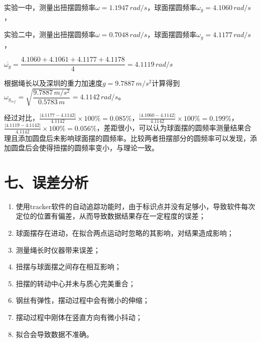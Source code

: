 \documentclass[11pt]{article}
\begin{document}
\begin{enumerate}
    实验一中，测量出扭摆圆频率$\omega = 1.1947\,rad/s$，球面摆圆频率$\omega_g = 4.1060\,rad/s$，
    
    实验二中，测量出扭摆圆频率$\omega = 0.7048\,rad/s$，球面摆圆频率$\omega_g = 4.1177\,rad/s$，
    
    $\overline{\omega_g}=\dfrac{4.1060+4.1061+4.1177+4.1178}{4}=4.1119\,rad/s$
    
    根据绳长以及深圳的重力加速度$g=9.7887\,m/s^2$计算得到$\omega_{g_{ref}}=\sqrt{\dfrac{9.7887\,m/s^2}{0.5783\,m}}=4.1142\,rad/s$。
    
    经过对比，$\frac{|4.1177-4.1142|}{4.1142}\times100\%=0.085\%$，$\frac{|4.1060-4.1142|}{4.1142}\times100\%=0.199\%$，$\frac{|4.1119-4.1142|}{4.1142}\times100\%=0.056\%$，差距很小，可以认为球面摆的圆频率测量结果合理且添加圆盘后未影响球面摆的圆频率。比较两者扭摆部分的圆频率可以发现，添加圆盘后会使得扭摆的圆频率变小，与理论一致。
\end{enumerate}

\section*{七、误差分析}

\begin{enumerate}
    \item 使用tracker软件的自动追踪功能时，由于标识点并没有足够小，导致软件每次定位的位置有偏差，从而导致数据结果存在一定程度的误差；
    \item 球面摆存在进动，在拟合两点运动时忽略的其影响，对结果造成影响；
    \item 测量绳长时仪器带来误差；
    \item 扭摆与球面摆之间存在相互影响；
    \item 扭摆的转动中心并未与质心完美重合；
    \item 钢丝有弹性，摆动过程中会有微小的伸缩；
    \item 摆动过程中刚体在竖直方向有微小抖动；
    \item 拟合会导致数据不准确。
\end{enumerate}
\end{document}

